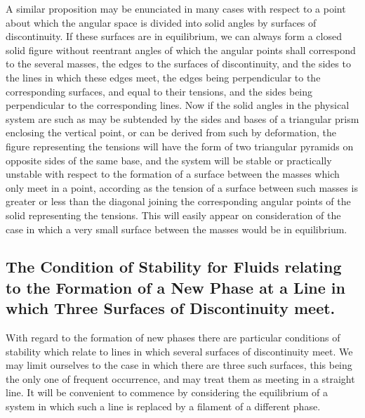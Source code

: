 \documentclass[12pt]{article}
\begin{document}
A similar proposition may be enunciated in many cases with respect to a point about which the angular space is divided into solid angles by surfaces of discontinuity. If these surfaces are in equilibrium, we can always form  a closed solid figure without reentrant angles of which the angular points shall correspond to the several masses, the edges to the surfaces of discontinuity, and the sides to the lines in which these edges meet, the edges being perpendicular to the corresponding surfaces, and equal to their tensions, and the sides being perpendicular to the corresponding lines. Now if the solid angles in the physical system are such as may be subtended by the sides and bases of a triangular prism enclosing the vertical point, or can be derived from such by deformation, the figure representing the tensions will have the form of two triangular pyramids on opposite sides of the same base, and the system will be stable or practically unstable with respect to the formation of a surface between the masses which only meet in a point, according as the tension of a surface between such masses is greater or less than the diagonal joining the corresponding angular points of the solid representing the tensions. This will easily appear on consideration of the case in which a very small surface between the masses would be in equilibrium.

\subsection{The Condition of Stability for Fluids relating to the Formation of a New Phase at a Line in which Three Surfaces of Discontinuity meet.}
With regard to the formation of new phases there are particular conditions of stability which relate to lines in which several surfaces of discontinuity meet. We may limit ourselves to the case in which there are three such surfaces, this being the only one of frequent occurrence, and may treat them as meeting in a straight line. It will be convenient to commence by considering the equilibrium of a system in which such a line is replaced by a filament of a different phase.
\end{document}
